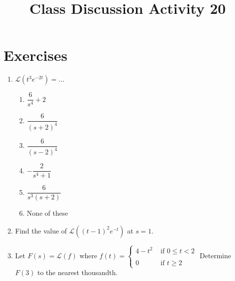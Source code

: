 \documentclass{ximera}
\begin{document}
\begin{abstract}
 \end{abstract}

    \title{Class Discussion Activity 20}
    
    \maketitle

\section*{Exercises}

\begin{enumerate}[label=(\arabic*)]


\item $\displaystyle \mathcal{L}(t^3e^{-2t})=\ldots$

\begin{enumerate}[label=(\alph*)]
\item $\dfrac{6}{s^4}+2$
\item $\dfrac{6}{(s+2)^4}$  %
\item $\dfrac{6}{(s-2)^4}$
\item $-\dfrac{2}{s^4+1}$
\item $\dfrac{6}{s^3(s+2)}$ 
\item None of these
\end{enumerate}


\item Find the value of $\mathcal{L}((t-1)^2e^{-t})$ at $s=1$.  





\item Let $F(s)=\mathcal{L}(f)$ where $f(t)=\left\{
     \begin{array}{lr}
       4-t^2 & \mbox{ if }0\leq t<2\\
       \\
       0 &  \mbox{ if }t\geq 2
     \end{array}\right.$  Determine $F(3)$ to the nearest thousandth.






\end{enumerate}
\end{document}
